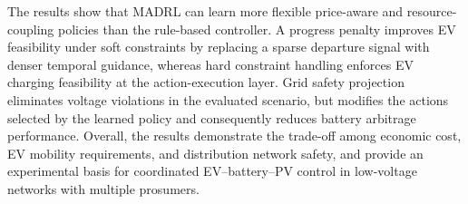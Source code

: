 The results show that MADRL can learn more flexible price-aware and resource-coupling policies than the rule-based controller. A progress penalty improves EV feasibility under soft constraints by replacing a sparse departure signal with denser temporal guidance, whereas hard constraint handling enforces EV charging feasibility at the action-execution layer. Grid safety projection eliminates voltage violations in the evaluated scenario, but modifies the actions selected by the learned policy and consequently reduces battery arbitrage performance. Overall, the results demonstrate the trade-off among economic cost, EV mobility requirements, and distribution network safety, and provide an experimental basis for coordinated EV--battery--PV control in low-voltage networks with multiple prosumers.
